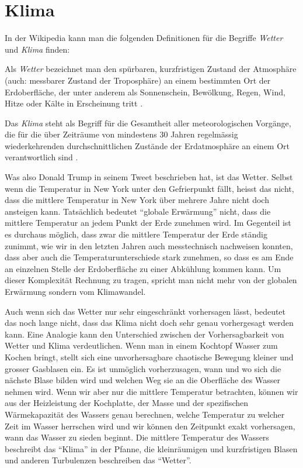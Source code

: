 %
%
%

\section{Klima\label{section:klima}}
In der Wikipedia kann man die folgenden Definitionen für die Begriffe
{\em Wetter}
und {\em Klima} finden:

\begin{definition}
Als {\em Wetter} bezeichnet man den
spürbaren, kurzfristigen Zustand der Atmosphäre (auch: messbarer
Zustand der Troposphäre) an einem bestimmten Ort der Erdoberfläche,
der unter anderem als Sonnenschein, Bewölkung, Regen, Wind, Hitze
oder Kälte in Erscheinung tritt
\cite{skript:wetter}.
\end{definition}
%

\begin{definition}
Das {\em Klima} steht als Begriff für die Gesamtheit aller meteorologischen
Vorgänge, die für die über Zeiträume von mindestens 30 Jahren
regelmässig wiederkehrenden durchschnittlichen Zustände der Erdatmosphäre
an einem Ort verantwortlich sind
\cite{skript:klima}.
\end{definition}
%

Was also Donald Trump in seinem Tweet beschrieben hat, ist das Wetter.
Selbst wenn die Temperatur in New York unter den Gefrierpunkt fällt, 
heisst das nicht, dass die mittlere Temperatur in New York über mehrere
Jahre nicht doch ansteigen kann.
Tatsächlich bedeutet ``globale Erwärmung'' nicht, dass die mittlere
Temperatur an jedem Punkt der Erde zunehmen wird.
Im Gegenteil ist es durchaus möglich, dass zwar die mittlere Temperatur
der Erde ständig zunimmt, wie wir in den letzten Jahren auch messtechnisch
nachweisen konnten, dass aber auch die Temperaturunterschiede stark zunehmen,
so dass es am Ende an einzelnen Stelle der Erdoberfläche zu einer 
Abkühlung kommen kann.
Um dieser Komplexität Rechnung zu tragen, spricht man nicht mehr von
der globalen Erwärmung sondern vom Klimawandel.
%

Auch wenn sich das Wetter nur sehr eingeschränkt vorhersagen lässt,
bedeutet das noch lange nicht, dass das Klima nicht doch sehr
genau vorhergesagt werden kann.
Eine Analogie kann den Unterschied zwischen der Vorhersagbarkeit
von Wetter und Klima verdeutlichen.
Wenn man in einem Kochtopf Wasser zum Kochen bringt, stellt sich
eine unvorhersagbare chaotische Bewegung kleiner und grosser
Gasblasen ein.
Es ist unmöglich vorherzusagen, wann und wo sich die nächste Blase
bilden wird und welchen Weg sie an die Oberfläche des Wasser nehmen
wird.
Wenn wir aber nur die mittlere Temperatur betrachten, können wir
aus der Heizleistung der Kochplatte, der Masse und der spezifischen
Wärmekapazität des Wassers genau berechnen, welche Temperatur zu welcher
Zeit im Wasser herrschen wird und wir können den Zeitpunkt exakt
vorhersagen, wann das Wasser zu sieden beginnt.
Die mittlere Temperatur des Wassers beschreibt das ``Klima''
in der Pfanne, die kleinräumigen und kurzfristigen Blasen und anderen
Turbulenzen beschreiben das ``Wetter''.


